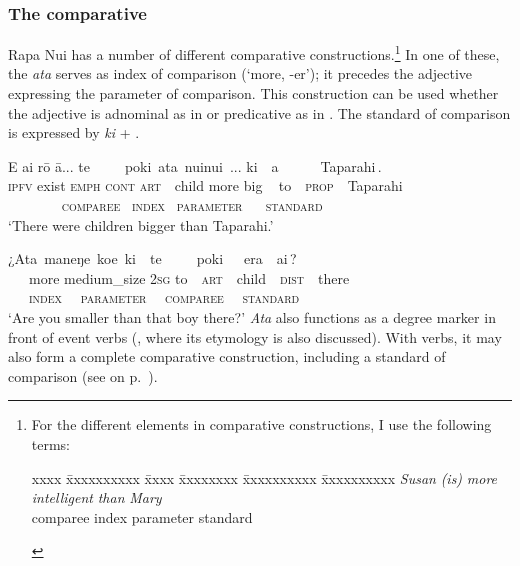 \subsubsection[The comparative]{The comparative}\label{sec:3.5.2.1}
Rapa Nui has a number of different comparative constructions.\footnote{\label{fn:137}For the different elements in comparative constructions, I use the following terms:
\begin{tabbing}
xxxx \= xxxxxxxxxx \= xxxx \= xxxxxxxx \= xxxxxxxxxx \= xxxxxxxxxx  \kill
\> \textit{Susan} \> \textit{(is)} \> \textit{more} \> \textit{intelligent} \> \textit{than} \textit{Mary}\\
  \> comparee  \>  \> index  \> parameter  \> standard
\end{tabbing}
  } In one of these, the  \textit{{\ꞌ}ata} serves as index of comparison (‘more, -er’); it precedes the adjective expressing the parameter of comparison. This construction can be used whether the adjective is adnominal as in  or predicative as in . The standard of comparison is expressed by \textit{ki} + .

\ea\label{ex:3.112}
\glll E ai rō {\ꞌ}ā... {\ob}te~~~~~poki\,{\cb} {\ob}{\ꞌ}ata\,{\cb} {\ob}nuinui\,{\cb} ... {\ob}ki~~a~~~~~~Taparahi\,{\cb}. \\
\textsc{ipfv} exist \textsc{emph} \textsc{cont} {\db}\textsc{art}~~child {\db}more {\db}big ~ {\db}to~~\textsc{prop}~~Taparahi \\
~ ~ ~ ~    \textsc{~comparee} \textsc{~index} \textsc{~parameter} ~ \textsc{~standard} \\

\glt 
‘There were children bigger than Taparahi.’ \textstyleExampleref{[R250.011]} 
\z

\ea\label{ex:3.113}
\glll ¿{\ob}{\ꞌ}Ata\,{\cb} {\ob}maneŋe\,{\cb} {\ob}koe\,{\cb} {\ob}ki~~te~~~~~poki~~~era~~ai\,{\cb}? \\
~~~more {\db}medium\_size {\db}\textsc{2sg} {\db}to~~\textsc{art}~~child~~\textsc{dist}~~there \\
~~\textsc{~index} \textsc{~~parameter} \textsc{~~comparee} \textsc{~~standard}\\

\glt
‘Are you smaller than that boy there?’ \textstyleExampleref{[}\textstyleExampleref{R415.176]}
\z
\textit{{\ꞌ}Ata} also functions as a degree marker in front of event verbs (, where its etymology is also discussed). With verbs, it may also form a complete comparative construction, including a standard of comparison (see  on p.~\pageref{ex:7.94}).

